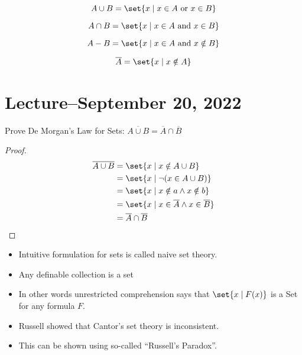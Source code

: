 \documentclass{scrreprt}
\begin{document}
\begin{definition}
	\[
		A \cup B = \set{x\mid x\in A \text{ or } x\in B}
	\]
\end{definition}

\begin{definition}[Intersection]
	\[
		A \cap B = \set{x\mid x\in A \text{ and } x\in B}
	\]
\end{definition}

\begin{definition}[Difference]
	\[
		A - B = \set{x\mid x\in A \text{ and } x\notin B}
	\]
\end{definition}

\begin{definition}[Complement]
	\[
		\overline{A} = \set{x\mid x\notin A}
	\]
\end{definition}

\section{Lecture--September 20, 2022}

Prove De Morgan's Law for Sets: $\overline{A\cup B} = \overline{A}\cap \overline{B}$

\begin{proof}
	\begin{align}
		\overline{A\cup B} &= \set{x\mid x\notin A\cup B} \\
						   &= \set{x \mid \neg(x\in A\cup B)} \\
						   &= \set{x \mid x \notin a \land x\notin b} \\
						   &= \set{x \mid x \in \overline{A} \land x\in \overline{B}} \\
		                   &= \overline{A}\cap \overline{B}
	\end{align}
\end{proof}

\begin{itemize}
	\item Intuitive formulation for sets is called naive set theory.
	\item Any definable collection is a set
	\item In other words unrestricted comprehension says that $\set{x\mid F(x)}$ is a Set
	for any formula $F$.
	\item Russell showed that Cantor's set theory is inconsistent.
	\item This can be shown using so-called ``Russell's Paradox''.
\end{itemize}
\end{document}
